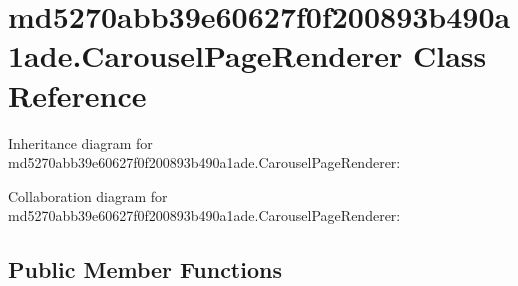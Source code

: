 \hypertarget{classmd5270abb39e60627f0f200893b490a1ade_1_1_carousel_page_renderer}{}\section{md5270abb39e60627f0f200893b490a1ade.\+Carousel\+Page\+Renderer Class Reference}
\label{classmd5270abb39e60627f0f200893b490a1ade_1_1_carousel_page_renderer}


Inheritance diagram for md5270abb39e60627f0f200893b490a1ade.\+Carousel\+Page\+Renderer\+:


Collaboration diagram for md5270abb39e60627f0f200893b490a1ade.\+Carousel\+Page\+Renderer\+:
\subsection*{Public Member Functions}
